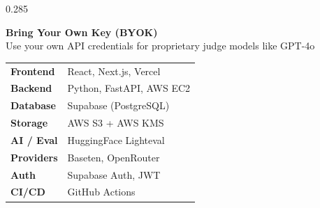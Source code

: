 \documentclass[final]{beamer}
\begin{document}
\begin{frame}[t]
\begin{columns}[T,totalwidth=\linewidth]
\begin{column}{0.285\linewidth}
\begin{tcolorbox}[sectionbox,title={Key Features}]
    \begin{tcolorbox}[featureft]
      {\fontsize{17}{21}\selectfont
      \textcolor{evalgreenLight}{\textbf{Bring Your Own Key (BYOK)}}\\[0.1cm]
      \color{white}Use your own API credentials for proprietary judge models like GPT-4o
      }
    \end{tcolorbox}

  \end{tcolorbox}

  \vspace{0.45cm}

  \begin{tcolorbox}[sectionbox,title={Technology Stack}]
    \renewcommand{\arraystretch}{1.45}
    {\fontsize{17}{22}\selectfont
    \begin{tabular}{@{}p{3.0cm}p{9.0cm}@{}}
      \textcolor{evalgreen}{\textbf{Frontend}}
        & React, Next.js, Vercel \\
      \textcolor{evalgreen}{\textbf{Backend}}
        & Python, FastAPI, AWS EC2 \\
      \textcolor{evalgreen}{\textbf{Database}}
        & Supabase (PostgreSQL) \\
      \textcolor{evalgreen}{\textbf{Storage}}
        & AWS S3 + AWS KMS \\
      \textcolor{evalgreen}{\textbf{AI / Eval}}
        & HuggingFace Lighteval \\
      \textcolor{evalgreen}{\textbf{Providers}}
        & Baseten, OpenRouter \\
      \textcolor{evalgreen}{\textbf{Auth}}
        & Supabase Auth, JWT \\
      \textcolor{evalgreen}{\textbf{CI/CD}}
        & GitHub Actions \\
    \end{tabular}
    }
  \end{tcolorbox}

  \vspace{0.45cm}


\end{column}
\end{columns}
\end{frame}
\end{document}
